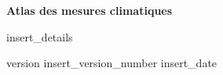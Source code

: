 \begin{titlepage}
    \begin{center}

        \vspace*{5cm}
        
        \Huge
        \textbf{Atlas des mesures climatiques}
        
        \vspace{0.5cm}
        \LARGE
        insert_details
        
        \vfill
        
        version insert_version_number
        insert_date
        
        
    \end{center}
\end{titlepage}
